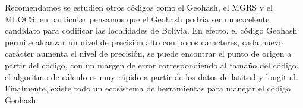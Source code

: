 \documentclass[letterpaper]{article}
\begin{document}
Recomendamos se estudien otros códigos como el Geohash, el MGRS y el
MLOCS, en particular pensamos que el Geohash podría ser un excelente
candidato para codificar las localidades de Bolivia. En efecto, el
código Geohash permite alcanzar un nivel de precisión alto con pocos
caracteres, cada nuevo carácter aumenta el nivel de precisión, se
puede encontrar el punto de origen a partir del código, con un margen
de error correspondiendo al tamaño del código, el algoritmo de
cálculo es muy rápido a partir de los datos de latitud y longitud.
Finalmente, existe todo un ecosistema de herramientas para manejar el
código Geohash.
\end{document}
